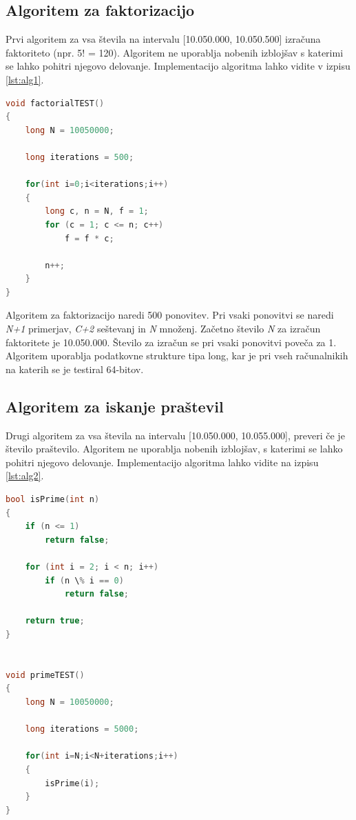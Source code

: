 \subsection{Algoritem za faktorizacijo}

Prvi algoritem za vsa števila na intervalu [10.050.000, 10.050.500] izračuna faktoriteto (npr. 5! = 120). Algoritem ne uporablja nobenih izblojšav s katerimi se lahko pohitri njegovo delovanje. Implementacijo algoritma lahko vidite v izpisu \ref{lst:alg1}.

\begin{lstlisting}[language=C++, caption=Algoritem faktoritet, label={lst:alg1}]
void factorialTEST()
{
    long N = 10050000;

    long iterations = 500;

	for(int i=0;i<iterations;i++)
	{
		long c, n = N, f = 1;
		for (c = 1; c <= n; c++)
			f = f * c;

		n++;
	}
}
\end{lstlisting} 

Algoritem za faktorizacijo naredi 500 ponovitev. Pri vsaki ponovitvi se naredi \textit{N+1} primerjav, \textit{C+2} seštevanj in \textit{N} množenj. Začetno število \textit{N} za izračun faktoritete je 10.050.000. Število za izračun se pri vsaki ponovitvi poveča za 1. Algoritem uporablja podatkovne strukture tipa long, kar je pri vseh računalnikih na katerih se je testiral 64-bitov. 

\subsection{Algoritem za iskanje praštevil}

Drugi algoritem za vsa števila na intervalu [10.050.000, 10.055.000], preveri če je število praštevilo. Algoritem ne uporablja nobenih izblojšav, s katerimi se lahko pohitri njegovo delovanje. Implementacijo algoritma lahko vidite na izpisu \ref{lst:alg2}.

\begin{lstlisting}[language=C++, caption=Algoritem faktoritet, label={lst:alg2}]
bool isPrime(int n)
{
    if (n <= 1)
        return false;

    for (int i = 2; i < n; i++)
        if (n \% i == 0)
            return false;

    return true;
}


void primeTEST()
{
	long N = 10050000;

	long iterations = 5000;

	for(int i=N;i<N+iterations;i++)
	{
		isPrime(i);
	}
}
\end{lstlisting} 


